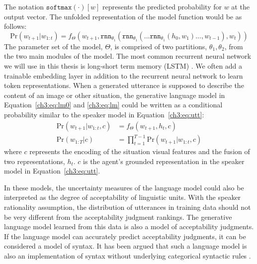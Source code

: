 The notation $\mathtt{softmax}(\cdot)[w]$ represents the predicted probability for $w$ at the output vector.
The unfolded representation of the model function would be as follows:
\begin{equation*}
\mathrm{Pr}( w_{t+1} | w_{1:t} ) = f_{\Theta}(w_{t+1}, \mathtt{rnn}_{\theta_1}(\mathtt{rnn}_{\theta_1}(...\mathtt{rnn}_{\theta_1}(h_0,w_{1})..., w_{t-1}), w_t))
\end{equation*}
The parameter set of the model, $\Theta$, is comprised of two partitions, ${\theta_1, \theta_2}$, from the two main modules of the model. 
The most common recurrent neural network we will use in this thesis is long-short term memory (LSTM) \citep{hochreiter1997long}.
We often add a trainable embedding layer in addition to the recurrent neural network to learn token representations. 
When a generated utterance is supposed to describe the content of an image or other situation, the generative language model in Equation~\ref{ch3:eq:lm0} and \ref{ch3:eq:lm} could be written as a conditional probability similar to the speaker model in Equation~\ref{ch3:eq:utt}: 
\begin{align}
\mathrm{Pr}( w_{t+1} | w_{1:t}, c ) &= f_{\Theta}(w_{t+1}, h_t, c) \label{ch3:eq:token_model}\\
\mathrm{Pr}( w_{1:T} | c)           &= \prod_{t=1}^{T-1} \mathrm{Pr}( w_{t+1} | w_{1:t}, c )
\end{align}
\noindent where $c$ represents the encoding of the situation \textemdash  visual features and the fusion of two representations, $h_t$. $c$ is the agent’s grounded representation in the speaker model in  Equation~\ref{ch3:eq:utt}. 

In these models, the uncertainty measures of the language model could also be interpreted as the degree of acceptability of linguistic units. 
With the speaker rationality assumption, the distribution of utterances in training data should not be very different from the acceptability judgment rankings. 
The generative language model learned from this data is also a model of acceptability judgments. If the language model can accurately predict acceptability judgments, it can be considered a model of syntax. 
It has been argued that such a language model is also an implementation of syntax without underlying categorical syntactic rules \citep[Section~3]{lau2017grammaticality}.

